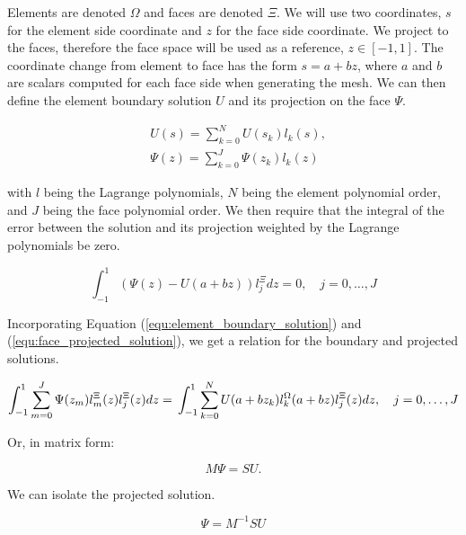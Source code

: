 Elements are denoted \(\Omega \) and faces are denoted \(\Xi \). We will use two coordinates, \(s\)
for the element side coordinate and \(z\) for the face side coordinate. We project to the faces,
therefore the face space will be used as a reference, \(z \in [-1, 1]\). The coordinate change from
element to face has the form \(s = a + bz\), where \(a\) and \(b\) are scalars computed for each
face side when generating the mesh. We can then define the element boundary solution \(U\) and its
projection on the face \(\Psi \).

\begin{align}
     & U(s) = \sum_{k = 0}^{N} U(s_k) l_k(s), \label{equ:element_boundary_solution}     \\
     & \Psi (z) = \sum_{k = 0}^{J} \Psi(z_k) l_k(z) \label{equ:face_projected_solution}
\end{align}

\noindent
with \(l\) being the Lagrange polynomials, \(N\) being the element polynomial order, and \(J\) being
the face polynomial order. We then require that the integral of the error between the solution and
its projection weighted by the Lagrange polynomials be zero.

\begin{equation} \label{equ:zero_error}
    \int_{-1}^{1} \left( \Psi (z) - U(a + bz) \right) l_j^\Xi dz = 0, \quad j = 0, \ldots,J
\end{equation}

Incorporating Equation (\ref{equ:element_boundary_solution}) and (\ref{equ:face_projected_solution}),
we get a relation for the boundary and projected solutions.

\begin{equation} \label{equ:boundarry_and_projected}
    \int_{-1}^{1} \sum_{m = 0}^{J} \Psi (z_m) l_m^\Xi (z) l_j ^ \Xi(z) dz = \\
    \int_{-1}^{1} \sum_{k = 0}^{N} U(a + b z_k) l_k^\Omega (a + b z) l_j ^ \Xi (z) dz, \\ \quad
    j = 0, \ldots, J
\end{equation}

Or, in matrix form:

\begin{equation}
    M \Psi = S U.
\end{equation}

We can isolate the projected solution.

\begin{equation}
    \Psi = M^{-1} S U
\end{equation}

